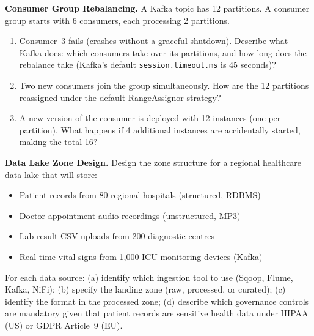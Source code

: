 \ap \textbf{Consumer Group Rebalancing.}
A Kafka topic has 12 partitions. A consumer group starts with 6 consumers,
each processing 2 partitions.
\begin{enumerate}[label=(\alph*)]
  \item Consumer~3 fails (crashes without a graceful shutdown). Describe
        what Kafka does: which consumers take over its partitions, and
        how long does the rebalance take (Kafka's default
        \texttt{session.timeout.ms} is 45 seconds)?
  \item Two new consumers join the group simultaneously. How are the 12
        partitions reassigned under the default RangeAssignor strategy?
  \item A new version of the consumer is deployed with 12 instances
        (one per partition). What happens if 4 additional instances are
        accidentally started, making the total 16?
\end{enumerate}

\ap \textbf{Data Lake Zone Design.}
Design the zone structure for a regional healthcare data lake that will
store:
\begin{itemize}
  \item Patient records from 80 regional hospitals (structured, RDBMS)
  \item Doctor appointment audio recordings (unstructured, MP3)
  \item Lab result CSV uploads from 200 diagnostic centres
  \item Real-time vital signs from 1{,}000 ICU monitoring devices (Kafka)
\end{itemize}
For each data source: (a) identify which ingestion tool to use (Sqoop,
Flume, Kafka, NiFi); (b) specify the landing zone (raw, processed, or
curated); (c) identify the format in the processed zone; (d) describe
which governance controls are mandatory given that patient records are
sensitive health data under HIPAA (US) or GDPR Article~9 (EU).


